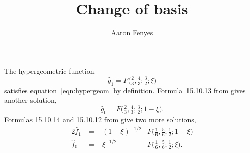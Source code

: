 \documentclass{article}
\title{Change of basis}
\author{Aaron Fenyes}
\date{}
\theoremstyle{definition}
\theoremstyle{plain}
\begin{document}
\maketitle
The hypergeometric function
\[ \hat{g}_1 = F\big(\tfrac{2}{3}, \tfrac{4}{3}; \tfrac{3}{2}; \xi\big) \]
satisfies equation~\ref{eqn:hypergeom} by definition. Formula~15.10.13 from \cite{dlmf} gives another solution,
\[ \hat{g}_0 = F\big(\tfrac{2}{3}, \tfrac{4}{3}; \tfrac{3}{2}; 1-\xi\big). \]
Formulas 15.10.14 and 15.10.12 from \cite{dlmf} give two more solutions,
\begin{alignat*}{2}
\hat{f}_1 &\;=\;& (1-\xi)^{-1/2} & F\big(\tfrac{1}{6}, \tfrac{5}{6}; \tfrac{1}{2}; 1-\xi\big) \\
\hat{f}_0 &\;=\;& \xi^{-1/2} & F\big(\tfrac{1}{6}, \tfrac{5}{6}; \tfrac{1}{2}; \xi\big).
\end{alignat*}
\end{document}
